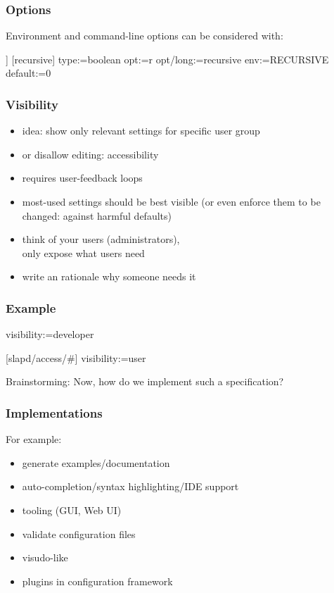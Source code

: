 \begin{frame}[fragile]
	\frametitle{Options}

	Environment and command-line options can be considered with:

	\begin{code}[morekeywords={long},gobble=4]]
	[recursive]
	  type:=boolean
	  opt:=r
	  opt/long:=recursive
	  env:=RECURSIVE
	  default:=0
	\end{code}
\end{frame}

\begin{frame}
	\frametitle{Visibility}
	\begin{itemize}
	\item idea: show only relevant settings for specific user group
	\item or disallow editing: accessibility
	\pause
	\item requires user-feedback loops~\cite{xu2015hey}
	\item most-used settings should be best visible (or even enforce them to be changed: against harmful defaults)
	\item think of your users (administrators), \\ only expose what users need
	\item write an rationale why someone needs it
	\end{itemize}
\end{frame}

\begin{frame}[fragile]
	\frametitle{Example}
	\begin{code}
	visibility:=developer

	[slapd/access/#]
	visibility:=user
	\end{code}
\end{frame}


\begin{assignment}
	\begin{task}
	Brainstorming: Now, how do we implement such a specification?
	\end{task}
\end{assignment}

\begin{frame}
	\frametitle{Implementations}
	For example:
	\begin{itemize}
	\item generate examples/documentation
	\item auto-completion/syntax highlighting/IDE support
	\item tooling (GUI, Web UI)
	\item validate configuration files
	\item visudo-like
	\item plugins in configuration framework
	\end{itemize}
\end{frame}

